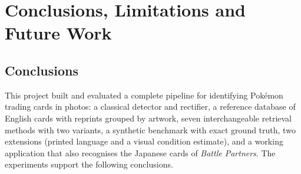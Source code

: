 \chapter{Conclusions, Limitations and Future Work}
\label{ch:conclusions}


\section{Conclusions}

This project built and evaluated a complete pipeline for identifying Pok\'emon trading cards in photos: a classical detector and rectifier, a reference database of  English cards with reprints grouped by artwork, seven interchangeable retrieval methods with two variants, a synthetic benchmark with exact ground truth, two extensions (printed language and a visual condition estimate), and a working application that also recognises the  Japanese cards of \emph{Battle Partners}. The experiments support the following conclusions.

